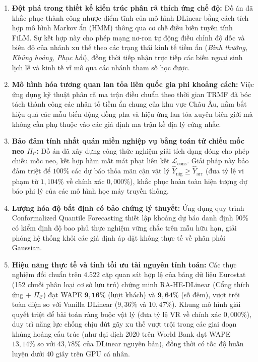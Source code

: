 \begin{enumerate}
    \item \textbf{Đột phá trong thiết kế kiến trúc phân rã thích ứng chế độ:} Đồ án đã khắc phục thành công nhược điểm tĩnh của mô hình DLinear bằng cách tích hợp mô hình Markov ẩn (HMM) thông qua cơ chế điều biến tuyến tính FiLM. Sự kết hợp này cho phép mạng nơ-ron tự động điều chỉnh độ dốc và biên độ của nhánh xu thế theo các trạng thái kinh tế tiềm ẩn (\textit{Bình thường, Khủng hoảng, Phục hồi}), đồng thời tiếp nhận trực tiếp các biến ngoại sinh lịch lễ và kinh tế vĩ mô qua các nhánh tham số học được.
    \item \textbf{Mô hình hóa tương quan lan tỏa liên quốc gia phi khoảng cách:} Việc ứng dụng kỹ thuật phân rã ma trận điều chuẩn theo thời gian TRMF đã bóc tách thành công các nhân tố tiềm ẩn chung của khu vực Châu Âu, nắm bắt hiệu quả các mẫu biến động đồng pha và hiệu ứng lan tỏa xuyên biên giới mà không cần phụ thuộc vào các giả định ma trận kề địa lý cứng nhắc.
    \item \textbf{Bảo đảm tính nhất quán miền nghiệp vụ bằng toán tử chiếu mốc neo $\Pi_{\mathcal{C}}$:} Đồ án đã xây dựng công thức nghiệm giải tích dạng đóng cho phép chiếu mốc neo, kết hợp hàm mất mát phạt liên kết $\mathcal{L}_{\text{cons}}$. Giải pháp này bảo đảm triệt để $100\%$ các dự báo thỏa mãn cận vật lý $\hat{Y}_{\text{nig}} \ge \hat{Y}_{\text{arr}}$ (đưa tỷ lệ vi phạm từ $1{,}104\%$ về chính xác $0{,}000\%$), khắc phục hoàn toàn hiện tượng dự báo phi lý của các mô hình học máy truyền thống.
    \item \textbf{Lượng hóa độ bất định có bảo chứng lý thuyết:} Ứng dụng quy trình Conformalized Quantile Forecasting thiết lập khoảng dự báo danh định 90\% có kiểm định độ bao phủ thực nghiệm vững chắc trên mẫu hữu hạn, giải phóng hệ thống khỏi các giả định áp đặt không thực tế về phân phối Gaussian.
    \item \textbf{Hiệu năng thực tế và tính tối ưu tài nguyên tính toán:} Các thực nghiệm đối chuẩn trên $4.522$ cặp quan sát hợp lệ của bảng dữ liệu Eurostat (152 chuỗi phân loại cơ sở lưu trú) chứng minh RA-HE-DLinear (Cổng thích ứng + $\Pi_{\mathcal{C}}$) đạt WAPE $\mathbf{9{,}16\%}$ (lượt khách) và $\mathbf{9{,}64\%}$ (số đêm), vượt trội toàn diện so với Vanilla DLinear ($9{,}36\%$ và $10{,}47\%$). Khung mô hình giải quyết triệt để bài toán ràng buộc vật lý (đưa tỷ lệ VR về chính xác $0{,}000\%$), duy trì năng lực chống chịu đứt gãy xu thế vượt trội trong các giai đoạn khủng hoảng cấu trúc (như đại dịch 2020 trên World Bank đạt WAPE $13{,}14\%$ so với $43{,}78\%$ của DLinear nguyên bản), đồng thời có tốc độ huấn luyện dưới 40 giây trên GPU cá nhân.
\end{enumerate}

